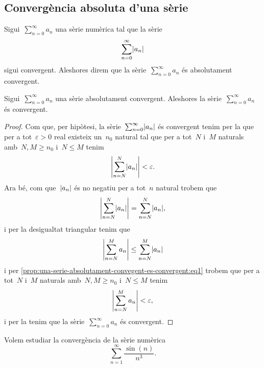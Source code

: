 \documentclass[../../main.tex]{subfiles}
\begin{document}
    \subsection{Convergència absoluta d'una sèrie}
    \begin{definition}
        \label{def:convergencia-absoluta-duna-serie}
        Sigui~\(\sum_{n=0}^{\infty}a_{n}\) una sèrie numèrica tal que la sèrie
        \[
            \sum_{n=0}^{\infty}\abs{a_{n}}
        \]
        sigui convergent.
        Aleshores direm que la sèrie~\(\sum_{n=0}^{\infty}a_{n}\) és absolutament convergent.
    \end{definition}
    \begin{proposition}
        \label{prop:una-serie-absolutament-convergent-es-convergent}
        Sigui~\(\sum_{n=0}^{\infty}a_{n}\) una sèrie absolutament convergent.
        Aleshores la sèrie~\(\sum_{n=0}^{\infty}a_{n}\) és convergent.
    \end{proposition}
    \begin{proof}
        Com que, per hipòtesi, la sèrie~\(\sum_{n=0}^{\infty}\abs{a_{n}}\) és convergent tenim per la  que per a tot~\(\varepsilon>0\) real existeix un~\(n_{0}\) natural tal que per a tot~\(N\) i~\(M\) naturals amb~\(N,M\geq n_{0}\) i~\(N\leq M\) tenim
        \begin{equation}
            \label{prop:una-serie-absolutament-convegent-es-convergent:eq1}
            \abs{\sum_{n=N}^{N}\abs{a_{n}}}<\varepsilon.
        \end{equation}
        Ara bé, com que~\(\abs{a_{n}}\) és no negatiu per a tot~\(n\) natural trobem que
        \[
            \abs{\sum_{n=N}^{N}\abs{a_{n}}}=\sum_{n=N}^{N}\abs{a_{n}},
        \]
        i per la desigualtat triangular %
        tenim que
        \[
            \abs{\sum_{n=N}^{M}a_{n}}\leq\sum_{n=N}^{M}\abs{a_{n}}
        \]
        i per \eqref{prop:una-serie-absolutament-convegent-es-convergent:eq1} trobem que per a tot~\(N\) i~\(M\) naturals amb~\(N,M\geq n_{0}\) i~\(N\leq M\) tenim
        \[
            \abs{\sum_{n=N}^{M}a_{n}}<\varepsilon,
        \]
        i per la  tenim que la sèrie~\(\sum_{n=0}^{\infty}a_{n}\) és convergent.
    \end{proof}
    \begin{example}
        \label{ex:serie-absolutament-convergent}
        Volem estudiar la convergència de la sèrie numèrica
        \begin{equation}
            \label{ex:serie-absolutament-convergent:eq1}
            \sum_{n=1}^{\infty}\frac{\sin(n)}{n^{3}}.
        \end{equation}
    \end{example}
\end{document}

